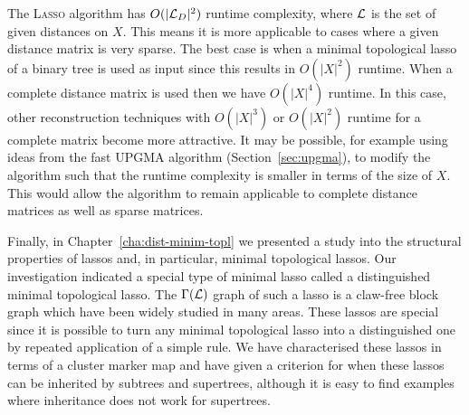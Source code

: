 The \textsc{Lasso} algorithm has $O(|{\mathcal L}_D|^2)$ runtime complexity, where
${\mathcal L}$ is the set of given distances on $X$.  This means it is more applicable
to cases where a given distance matrix is very sparse.  The best case is when
a minimal topological lasso of a binary tree is used as input since this
results in $O(|X|^2)$ runtime.  When a complete distance matrix is used then
we have $O(|X|^4)$ runtime.  In this case, other reconstruction techniques
with $O(|X|^3)$ or $O(|X|^2)$ runtime for a complete matrix become more
attractive.  It may be possible, for example using ideas from the fast
\textsc{UPGMA} algorithm (Section~\ref{sec:upgma}), to modify the algorithm
such that the runtime complexity is smaller in terms of the size of $X$.  This
would allow the algorithm to remain applicable to complete distance matrices
as well as sparse matrices.

Finally, in Chapter~\ref{cha:dist-minim-topl} we presented a study into the
structural properties of lassos and, in particular, minimal topological
lassos.  Our investigation indicated a special type of minimal lasso called a
distinguished minimal topological lasso.  The $\Gamma({\mathcal L})$ graph of such a
lasso is a claw-free block graph which have been widely studied in many areas.
These lassos are special since it is possible to turn any minimal topological
lasso into a distinguished one by repeated application of a simple rule.  We
have characterised these lassos in terms of a cluster marker map and have
given a criterion for when these lassos can be inherited by subtrees and
supertrees, although it is easy to find examples where inheritance does not
work for supertrees.


